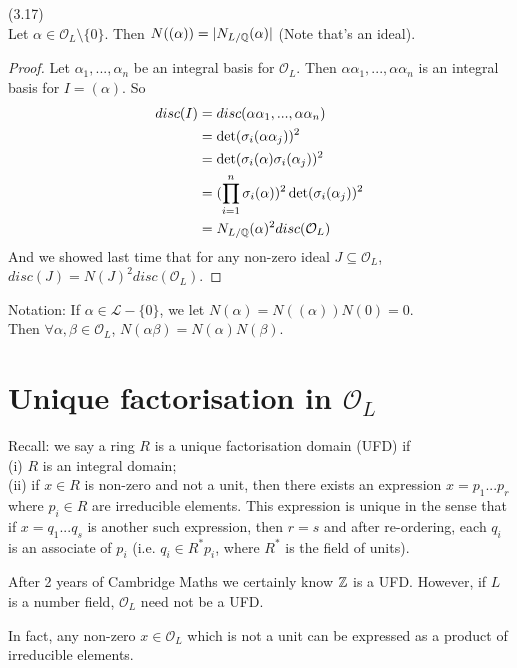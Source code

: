 \documentclass[a4paper]{article}
\begin{document}
\begin{lemma} (3.17)\\
Let $\alpha \in \mathcal{O}_L \setminus\{0\}$. Then $N((\alpha)) = |N_{L/\mathbb{Q}}(\alpha)|$ (Note that's an ideal).
\begin{proof}
Let $\alpha_1,...,\alpha_n$ be an integral basis for $\mathcal{O}_L$. Then $\alpha\alpha_1,...,\alpha\alpha_n$ is an integral basis for $I=(\alpha)$. So
\begin{equation*}
\begin{aligned}
disc(I) &= disc(\alpha\alpha_1,...,\alpha\alpha_n)\\
&= \det(\sigma_i(\alpha\alpha_j))^2\\
&= \det(\sigma_i(\alpha)\sigma_i(\alpha_j))^2\\
&= (\prod_{i=1}^n \sigma_i(\alpha))^2 \det(\sigma_i(\alpha_j))^2\\
&= N_{L/\mathbb{Q}}(\alpha)^2 disc(\mathcal{O}_L)
\end{aligned}
\end{equation*}
And we showed last time that for any non-zero ideal $J \subseteq \mathcal{O}_L$, $disc(J) = N(J)^2 disc(\mathcal{O}_L)$.
\end{proof}
\end{lemma}

Notation: If $\alpha \in \mathcal{L}-\{0\}$, we let $N(\alpha) = N((\alpha)) N(0) = 0$.\\
Then $\forall \alpha,\beta \in \mathcal{O}_L$, $N(\alpha\beta) = N(\alpha)N(\beta)$.

\newpage
\section{Unique factorisation in $\mathcal{O}_L$}
Recall: we say a ring $R$ is a unique factorisation domain (UFD) if\\
(i) $R$ is an integral domain;\\
(ii) if $x \in R$ is non-zero and not a unit, then there exists an expression $x=p_1...p_r$ where $p_i \in R$ are irreducible elements. This expression is unique in the sense that if $x = q_1...q_s$ is another such expression, then $r=s$ and after re-ordering, each $q_i$ is an associate of $p_i$ (i.e. $q_i \in R^* p_i$, where $R^*$ is the field of units).

After 2 years of Cambridge Maths we certainly know $\mathbb{Z}$ is a UFD. However, if $L$ is a number field, $\mathcal{O}_L$ need not be a UFD.

In fact, any non-zero $x \in \mathcal{O}_L$ which is not a unit can be expressed as a product of irreducible elements.
\end{document}

